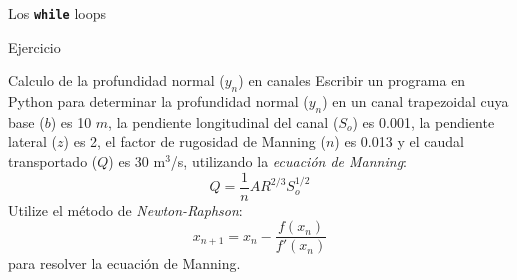 \documentclass[
10pt,
aspectratio=169,
]{beamer}
\newcommand{\co}[1]{\alert{\textbf{\texttt{#1}}}}
\begin{document}
\begin{frame}[fragile]{Los \co{while} loops}

\end{frame}

\begin{frame}[c]{Ejercicio}
\begin{block}{Calculo de la profundidad normal ($y_n$) en canales}
Escribir un programa en Python para determinar la profundidad normal ($y_n$) en un canal trapezoidal cuya base ($b$) es 10 $m$, la pendiente longitudinal del canal ($S_o$) es 0.001, la pendiente lateral ($z$) es 2, el factor de rugosidad de Manning ($n$) es 0.013 y el caudal transportado ($Q$) es 30 m$^3$/s, utilizando la \emph{ecuaci\'on de Manning}:
$$
Q = \frac{1}{n}AR^{2/3}S_o^{1/2}
$$
Utilize el m\'etodo de \emph{Newton-Raphson}:
$$
x_{n+1} = x_n - \frac{f(x_n)}{f'(x_n)}
$$
 para resolver la ecuaci\'on de Manning. 
\end{block}
\end{frame}
\end{document}
